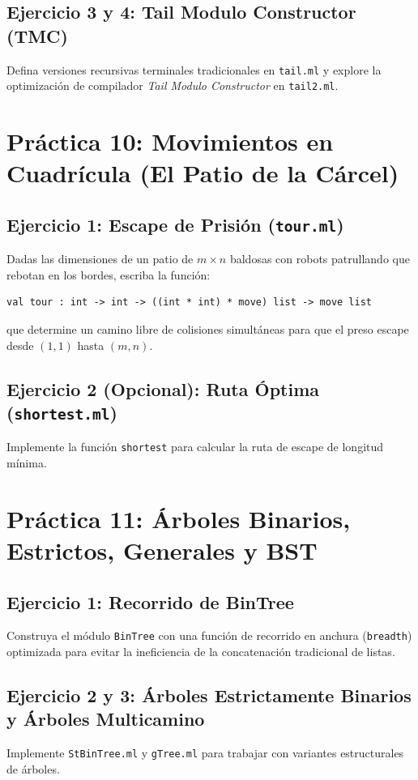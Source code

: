 \documentclass[11pt,a4paper]{article}
\begin{document}
\subsection{Ejercicio 3 y 4: Tail Modulo Constructor (TMC)}
Defina versiones recursivas terminales tradicionales en \texttt{tail.ml} y explore la optimización de compilador \textit{Tail Modulo Constructor} en \texttt{tail2.ml}.


\section{Práctica 10: Movimientos en Cuadrícula (El Patio de la Cárcel)}
\subsection{Ejercicio 1: Escape de Prisión (\texttt{tour.ml})}
Dadas las dimensiones de un patio de $m \times n$ baldosas con robots patrullando que rebotan en los bordes, escriba la función:
\begin{lstlisting}
val tour : int -> int -> ((int * int) * move) list -> move list
\end{lstlisting}
que determine un camino libre de colisiones simultáneas para que el preso escape desde $(1,1)$ hasta $(m,n)$.

\subsection{Ejercicio 2 (Opcional): Ruta Óptima (\texttt{shortest.ml})}
Implemente la función \texttt{shortest} para calcular la ruta de escape de longitud mínima.


\section{Práctica 11: Árboles Binarios, Estrictos, Generales y BST}
\subsection{Ejercicio 1: Recorrido de BinTree}
Construya el módulo \texttt{BinTree} con una función de recorrido en anchura (\texttt{breadth}) optimizada para evitar la ineficiencia de la concatenación tradicional de listas.

\subsection{Ejercicio 2 y 3: Árboles Estrictamente Binarios y Árboles Multicamino}
Implemente \texttt{StBinTree.ml} y \texttt{gTree.ml} para trabajar con variantes estructurales de árboles.
\end{document}
